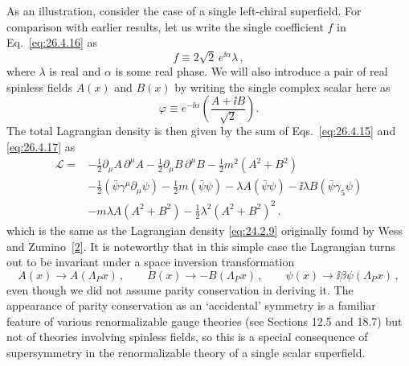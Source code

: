 As an illustration, consider the case of a single left-chiral superfield. For
comparison with earlier results, let us write the single coefficient \(f\) in
Eq.~\eqref{eq:26.4.16} as
\begin{equation}
  f\equiv2\sqrt2\,e^{\ii\alpha}\lambda\,,
  \tag{26.4.18}\label{eq:26.4.18}
\end{equation}
where \(\lambda\) is real and \(\alpha\) is some real phase. We will also
introduce a pair of real spinless fields \(A(x)\) and \(B(x)\) by writing the
single complex scalar here as
\begin{equation}
  \varphi\equiv e^{-\ii\alpha}\left(\frac{A+\ii B}{\sqrt2}\right).
  \tag{26.4.19}\label{eq:26.4.19}
\end{equation}
The total Lagrangian density is then given by the sum of
Eqs.~\eqref{eq:26.4.15} and \eqref{eq:26.4.17} as
\begin{equation}
  \begin{aligned}
  \mathcal{L}={}&
  -\frac12\partial_\mu A\,\partial^\mu A
  -\frac12\partial_\mu B\,\partial^\mu B
  -\frac12m^2(A^2+B^2)
  \\
  &-\frac12(\bar\psi\gamma^\mu\partial_\mu\psi)
  -\frac12m(\bar\psi\psi)
  -\lambda A(\bar\psi\psi)
  -\ii\lambda B(\bar\psi\gamma_5\psi)
  \\
  &-m\lambda A(A^2+B^2)
  -\frac12\lambda^2(A^2+B^2)^2\,.
  \end{aligned}
  \tag{26.4.20}\label{eq:26.4.20}
\end{equation}
which is the same as the Lagrangian density \eqref{eq:24.2.9} originally found
by Wess and Zumino~\hyperref[ch26-ref-2]{[2]}. It is noteworthy that in this
simple case the Lagrangian turns out to be invariant under a space inversion
transformation
\begin{equation}
  A(x)\longrightarrow A(\Lambda_Px)\,,
  \qquad
  B(x)\longrightarrow-B(\Lambda_Px)\,,
  \qquad
  \psi(x)\longrightarrow \ii\beta\psi(\Lambda_Px)\,,
  \tag{26.4.21}\label{eq:26.4.21}
\end{equation}
even though we did not assume parity conservation in deriving it. The
appearance of parity conservation as an `accidental' symmetry is a familiar
feature of various renormalizable gauge theories (see Sections 12.5 and 18.7)
but not of theories involving spinless fields, so this is a special
consequence of supersymmetry in the renormalizable theory of a single scalar
superfield.
